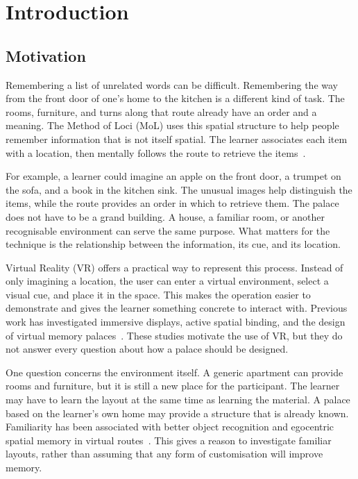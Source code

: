 \chapter{Introduction}
\label{chap:intro}

\section{Motivation}
Remembering a list of unrelated words can be difficult. Remembering the way from the front door of one's home to the kitchen is a different kind of task. The rooms, furniture, and turns along that route already have an order and a meaning. The Method of Loci (MoL) uses this spatial structure to help people remember information that is not itself spatial. The learner associates each item with a location, then mentally follows the route to retrieve the items~\cite{moll2023,reggente2020}.

For example, a learner could imagine an apple on the front door, a trumpet on the sofa, and a book in the kitchen sink. The unusual images help distinguish the items, while the route provides an order in which to retrieve them. The palace does not have to be a grand building. A house, a familiar room, or another recognisable environment can serve the same purpose. What matters for the technique is the relationship between the information, its cue, and its location.

Virtual Reality (VR) offers a practical way to represent this process. Instead of only imagining a location, the user can enter a virtual environment, select a visual cue, and place it in the space. This makes the operation easier to demonstrate and gives the learner something concrete to interact with. Previous work has investigated immersive displays, active spatial binding, and the design of virtual memory palaces~\cite{krokos2019,reggente2020,moll2023}. These studies motivate the use of VR, but they do not answer every question about how a palace should be designed.

One question concerns the environment itself. A generic apartment can provide rooms and furniture, but it is still a new place for the participant. The learner may have to learn the layout at the same time as learning the material. A palace based on the learner's own home may provide a structure that is already known. Familiarity has been associated with better object recognition and egocentric spatial memory in virtual routes~\cite{merriman2016}. This gives a reason to investigate familiar layouts, rather than assuming that any form of customisation will improve memory.


